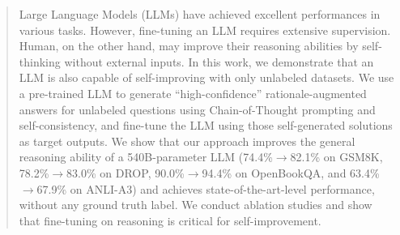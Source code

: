 \begin{abstract}
Large Language Models (LLMs) have achieved excellent performances in various tasks. However, fine-tuning an LLM requires extensive supervision. Human, on the other hand, may improve their reasoning abilities by self-thinking without external inputs. In this work, we demonstrate that an LLM is also capable of self-improving with only unlabeled datasets.
We use a pre-trained LLM to generate ``high-confidence'' rationale-augmented answers for unlabeled questions using Chain-of-Thought prompting and self-consistency, and fine-tune the LLM using those self-generated solutions as target outputs. We show that our approach improves the general reasoning ability of a 540B-parameter LLM (74.4\%$\rightarrow$82.1\% on GSM8K, 78.2\%$\rightarrow$83.0\% on DROP, 90.0\%$\rightarrow$94.4\% on OpenBookQA, and 63.4\%$\rightarrow$67.9\% on ANLI-A3) and achieves state-of-the-art-level performance, without any ground truth label. We conduct ablation studies and show that fine-tuning on reasoning is critical for self-improvement.
\end{abstract}